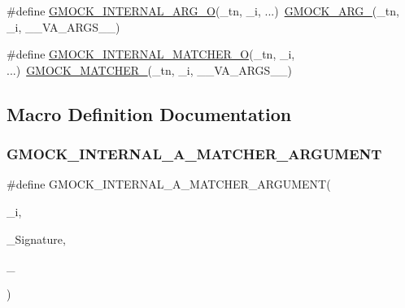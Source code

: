 \begin{DoxyCompactItemize}
\#define \mbox{\hyperlink{_obj__test_2lib_2googletest-master_2googlemock_2include_2gmock_2gmock-function-mocker_8h_ab154749bfdbffeaca0877adaa73c2232}{G\+M\+O\+C\+K\+\_\+\+I\+N\+T\+E\+R\+N\+A\+L\+\_\+\+A\+R\+G\+\_\+O}}(\+\_\+tn,  \+\_\+i, ...)~\mbox{\hyperlink{_obj__test_2lib_2googletest-release-1_88_81_2googlemock_2include_2gmock_2gmock-generated-function-mockers_8h_a887575cc1c31158fba808180a10c004f}{G\+M\+O\+C\+K\+\_\+\+A\+R\+G\+\_\+}}(\+\_\+tn, \+\_\+i, \+\_\+\+\_\+\+V\+A\+\_\+\+A\+R\+G\+S\+\_\+\+\_\+)
\item 
\#define \mbox{\hyperlink{_obj__test_2lib_2googletest-master_2googlemock_2include_2gmock_2gmock-function-mocker_8h_a7f910424bb402247dfcba313bea0eda5}{G\+M\+O\+C\+K\+\_\+\+I\+N\+T\+E\+R\+N\+A\+L\+\_\+\+M\+A\+T\+C\+H\+E\+R\+\_\+O}}(\+\_\+tn,  \+\_\+i, ...)~\mbox{\hyperlink{_obj__test_2lib_2googletest-release-1_88_81_2googlemock_2include_2gmock_2gmock-generated-function-mockers_8h_aa87d0009fe91f1c89d658776b55a769c}{G\+M\+O\+C\+K\+\_\+\+M\+A\+T\+C\+H\+E\+R\+\_\+}}(\+\_\+tn, \+\_\+i, \+\_\+\+\_\+\+V\+A\+\_\+\+A\+R\+G\+S\+\_\+\+\_\+)
\end{DoxyCompactItemize}


\subsection{Macro Definition Documentation}
\mbox{\label{_obj__test_2lib_2googletest-master_2googlemock_2include_2gmock_2gmock-function-mocker_8h_ab124145546366f2495dc81c5ba3ed541}} 
\subsubsection{\texorpdfstring{GMOCK\_INTERNAL\_A\_MATCHER\_ARGUMENT}{GMOCK\_INTERNAL\_A\_MATCHER\_ARGUMENT}}
{\footnotesize\ttfamily \#define G\+M\+O\+C\+K\+\_\+\+I\+N\+T\+E\+R\+N\+A\+L\+\_\+\+A\+\_\+\+M\+A\+T\+C\+H\+E\+R\+\_\+\+A\+R\+G\+U\+M\+E\+NT(\begin{DoxyParamCaption}\item[{}]{\+\_\+i,  }\item[{}]{\+\_\+\+Signature,  }\item[{}]{\+\_\+ }\end{DoxyParamCaption})}

